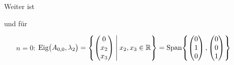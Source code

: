 \documentclass{scrreprt}
\begin{document}
\begin{enumerate}[(a)]
  Weiter ist
  und für
  \begin{itemize}
  \item[$n = 0$:] $\text{Eig}\qty\big(A_{0, 0}, \lambda_2) = \qty{
      \begin{pmatrix}
        0   \\
        x_2 \\
        x_3 \\
      \end{pmatrix}
      \:\middle|\:
      x_2, x_3 \in \mathbb{R}
    } = \text{Span}\qty{
      \begin{pmatrix}
        0 \\
        1 \\
        0 \\
      \end{pmatrix}, \begin{pmatrix}
        0 \\
        0 \\
        1 \\
      \end{pmatrix}
    }$


\end{itemize}
\end{enumerate}
\end{document}

